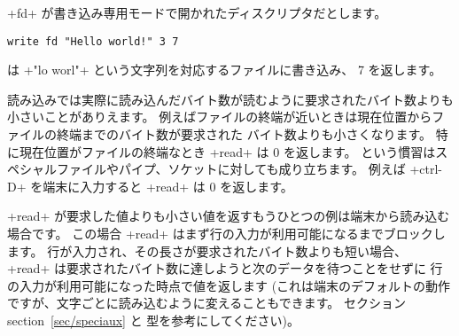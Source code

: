 
\begin{example}
\ml+fd+ が書き込み専用モードで開かれたディスクリプタだとします。
%
\begin{lstlisting}
write fd "Hello world!" 3 7
\end{lstlisting}
%
は \ml+"lo worl"+ という文字列を対応するファイルに書き込み、 7 を返します。
\end{example}

読み込みでは実際に読み込んだバイト数が読むように要求されたバイト数よりも小さいことがありえます。
例えばファイルの終端が近いときは現在位置からファイルの終端までのバイト数が要求された
バイト数よりも小さくなります。
特に現在位置がファイルの終端なとき \ml+read+ は 0 を返します。
 という慣習はスペシャルファイルやパイプ、ソケットに対しても成り立ちます。
例えば \ml+ctrl-D+ を端末に入力すると \ml+read+ は 0 を返します。

\ml+read+ が要求した値よりも小さい値を返すもうひとつの例は端末から読み込む場合です。
この場合 \ml+read+ はまず行の入力が利用可能になるまでブロックします。
行が入力され、その長さが要求されたバイト数よりも短い場合、
\ml+read+ は要求されたバイト数に達しようと次のデータを待つことをせずに
行の入力が利用可能になった時点で値を返します
(これは端末のデフォルトの動作ですが、文字ごとに読み込むように変えることもできます。
 セクション section~\ref{sec/speciaux} と  型を参考にしてください)。

